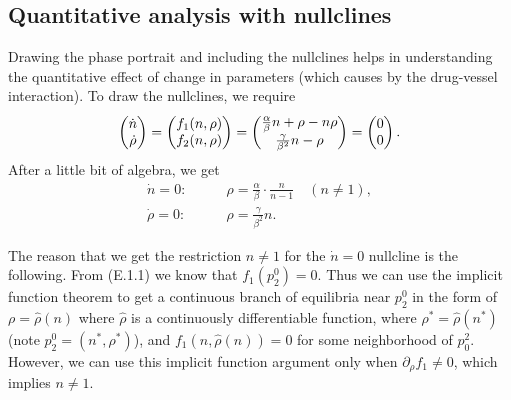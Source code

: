 \FloatBarrier



\subsection*{Quantitative analysis with nullclines}
Drawing the phase portrait and including the nullclines helps in understanding the quantitative effect of change in parameters (which causes by the drug-vessel interaction). To draw the nullclines, we require
\[ \begin{pmatrix} \dot{n} \\ \dot{\rho} \end{pmatrix} = \begin{pmatrix} f_1(n,\rho) \\ f_2(n,\rho) \end{pmatrix} = \begin{pmatrix} \frac{\alpha}{\beta}n + \rho - n\rho \\ \frac{\gamma}{\beta^2}n - \rho \end{pmatrix} = \begin{pmatrix} 0 \\ 0 \end{pmatrix}. \]
After a little bit of algebra, we get
\begin{align*}
	\dot{n} = 0:& \qquad \rho = \frac{\alpha}{\beta}\cdot \frac{n}{n-1} \quad (n\neq 1),\\
	\dot{\rho} = 0:& \qquad \rho = \frac{\gamma}{\beta^2}n.
\end{align*}

\begin{observation}
	The reason that we get the restriction $n\neq 1$ for the $\dot{n} = 0$ nullcline is the following. From (E.1.1) we know that $f_1(p^0_2)=0$. Thus we can use the implicit function theorem to get a continuous branch of equilibria near $p_2^0$ in the form of $\rho = \hat{\rho}(n)$ where $\hat{\rho}$ is a continuously differentiable function, where $\rho^* = \hat{\rho}(n^*)$ (note $p^0_2 = (n^*, \rho^*)$), and $f_1(n,\hat{\rho}(n)) = 0$ for some neighborhood of $p_0^2$. However, we can use this implicit function argument only when $\partial_\rho f_1 \neq 0$, which implies $n\neq 1$.
\end{observation}


